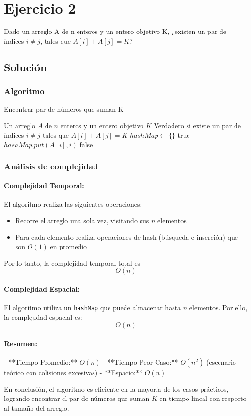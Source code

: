 \section{Ejercicio 2}
Dado un arreglo A de n enteros y un entero objetivo K, ¿existen un par de índices $i \neq j$, tales que $A[i] + A[j] = K$?

\subsection*{Solución}
\subsubsection*{Algoritmo}
\begin{algorithm}[H]
\caption{Encontrar par de números que suman K}
\begin{algorithmic}[1]
\REQUIRE Un arreglo $A$ de $n$ enteros y un entero objetivo $K$
\ENSURE Verdadero si existe un par de índices $i \neq j$ tales que $A[i] + A[j] = K$
\STATE $hashMap \gets \{\}$
        \RETURN true
    \ENDIF
    \STATE $hashMap.put(A[i], i)$
\ENDFOR
\RETURN false
\end{algorithmic}
\end{algorithm}

\subsubsection*{Análisis de complejidad}
\paragraph{Complejidad Temporal:}
El algoritmo realiza las siguientes operaciones:
\begin{itemize}
    \item Recorre el arreglo una sola vez, visitando sus $n$ elementos
    \item Para cada elemento realiza operaciones de hash (búsqueda e inserción) que son $O(1)$ en promedio
\end{itemize}
Por lo tanto, la complejidad temporal total es:
\[
O(n)
\]

\paragraph{Complejidad Espacial:}
El algoritmo utiliza un \texttt{hashMap} que puede almacenar hasta $n$ elementos. Por ello, la complejidad espacial es:
\[
O(n)
\]

\paragraph{Resumen:}  
- **Tiempo Promedio:** \(O(n)\)  
- **Tiempo Peor Caso:** \(O(n^2)\) (escenario teórico con colisiones excesivas)  
- **Espacio:** \(O(n)\)

En conclusión, el algoritmo es eficiente en la mayoría de los casos prácticos, logrando encontrar el par de números que suman \(K\) en tiempo lineal con respecto al tamaño del arreglo.

